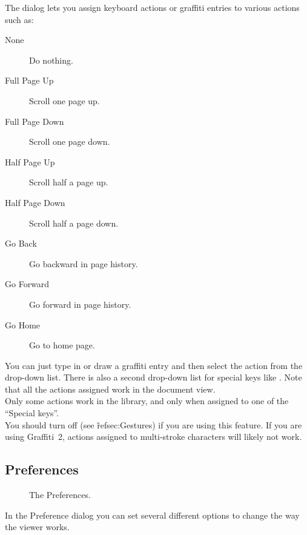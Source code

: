 The  dialog lets you assign keyboard actions or
graffiti entries to various actions such as:\\

\begin{description}
  \item[None] Do nothing.
  \item[Full Page Up] Scroll one page up.
  \item[Full Page Down] Scroll one page down.
  \item[Half Page Up] Scroll half a page up.
  \item[Half Page Down] Scroll half a page down.
  \item[Go Back] Go backward in page history.
  \item[Go Forward] Go forward in page history.
  \item[Go Home] Go to home page.
\end{description}

You can just type in or draw a graffiti entry and then select the action
from the drop-down list.  There is also a second drop-down list for
special keys like .  Note that all the actions assigned work in the
document view.\\

Only some actions work in the library, and only when assigned to one of the
``Special keys''.\\

You should turn off  (see \~ref{sec:Gestures}) if
you are using this feature.  If you are using Graffiti~2, actions assigned
to multi-stroke characters will likely not work.

\subsection{Preferences}\label{sec:Prefs}

\begin{figure} [!htb]
\centerline{}
\caption{\label{fig:Prefs}The Preferences.}
\end{figure}

In the Preference dialog you can set several different options to 
change the way the viewer works.\\

